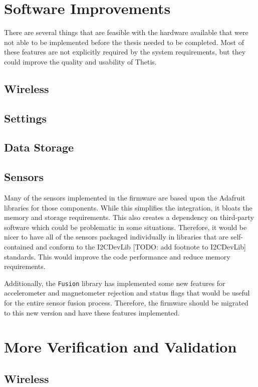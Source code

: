 \section{Software Improvements}
There are several things that are feasible with the hardware available that were not able to be implemented before the thesis needed to be completed.
Most of these features are not explicitly required by the system requirements, but they could improve the quality and usability of Thetis.

\subsection{Wireless}

\subsection{Settings}

\subsection{Data Storage}


\subsection{Sensors}
Many of the sensors implemented in the firmware are based upon the Adafruit libraries for those components.
While this simplifies the integration, it bloats the memory and storage requirements.
This also creates a dependency on third-party software which could be problematic in some situations.
Therefore, it would be nicer to have all of the sensors packaged individually in libraries that are self-contained and conform to the I2CDevLib [TODO: add footnote to I2CDevLib] standards.
This would improve the code performance and reduce memory requirements.

Additionally, the \lstinline[style=custominline]|Fusion| library has implemented some new features for accelerometer and magnetometer rejection and status flags that would be useful for the entire sensor fusion process.
Therefore, the firmware should be migrated to this new version and have these features implemented.

\section{More Verification and Validation}

\subsection{Wireless}

